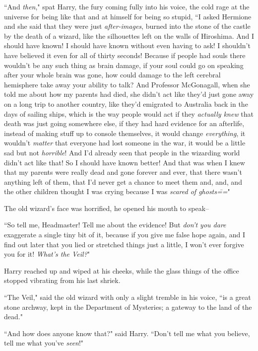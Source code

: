 ``And \emph{then}," spat Harry, the fury coming fully into his voice, the cold rage at the universe for being like that and at himself for being so stupid, ``I asked Hermione and she said that they were just \emph{after-images}, burned into the stone of the castle by the death of a wizard, like the silhouettes left on the walls of Hiroshima. And I should have known! I should have known without even having to ask! I shouldn't have believed it even for all of thirty seconds! Because if people had souls there wouldn't be any such thing as brain damage, if your soul could go on speaking after your whole brain was gone, how could damage to the left cerebral hemisphere take away your ability to talk? And Professor McGonagall, when she told me about how my parents had died, she didn't act like they'd just gone away on a long trip to another country, like they'd emigrated to Australia back in the days of sailing ships, which is the way people would act if they \emph{actually knew} that death was just going somewhere else, if they had hard evidence for an afterlife, instead of making stuff up to console themselves, it would change \emph{everything}, it wouldn't \emph{matter} that everyone had lost someone in the war, it would be a little sad but not \emph{horrible}! And I'd already seen that people in the wizarding world didn't act like that! So I should have known better! And that was when I knew that my parents were really dead and gone forever and ever, that there wasn't anything left of them, that I'd never get a chance to meet them and, and, and the other children thought I was crying because I was \emph{scared of ghosts\===}"

The old wizard's face was horrified, he opened his mouth to speak\---

``So tell me, Headmaster! Tell me about the evidence! But \emph{don't you dare} exaggerate a single tiny bit of it, because if you give me false hope again, and I find out later that you lied or stretched things just a little, I won't ever forgive you for it! \emph{What's the Veil?}"

Harry reached up and wiped at his cheeks, while the glass things of the office stopped vibrating from his last shriek.

``The Veil," said the old wizard with only a slight tremble in his voice, ``is a great stone archway, kept in the Department of Mysteries; a gateway to the land of the dead."

``And how does anyone know that?" said Harry. ``Don't tell me what you believe, tell me what you've \emph{seen}!"

